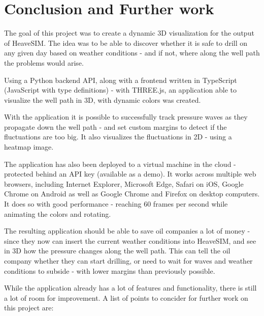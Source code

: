 \hypertarget{conclusion-and-further-work}{%
\section{Conclusion and Further
work}\label{conclusion-and-further-work}}

The goal of this project was to create a dynamic 3D visualization for
the output of HeaveSIM. The idea was to be able to discover whether it
is safe to drill on any given day based on weather conditions - and if
not, where along the well path the problems would arise.

Using a Python backend API, along with a frontend written in TypeScript
(JavaScript with type definitions) - with THREE.js, an application able
to visualize the well path in 3D, with dynamic colors was created.

With the application it is possible to successfully track pressure waves
as they propagate down the well path - and set custom margins to detect
if the fluctuations are too big. It also visualizes the fluctuations in
2D - using a heatmap image.

The application has also been deployed to a virtual machine in the cloud
- protected behind an API key (available as a demo). It works across
multiple web browsers, including Internet Explorer, Microsoft Edge,
Safari on iOS, Google Chrome on Android as well as Google Chrome and
Firefox on desktop computers. It does so with good performance -
reaching 60 frames per second while animating the colors and rotating.

The resulting application should be able to save oil companies a lot of
money - since they now can insert the current weather conditions into
HeaveSIM, and see in 3D how the pressure changes along the well path.
This can tell the oil company whether they can start drilling, or need
to wait for waves and weather conditions to subside - with lower margins
than previously possible.

While the application already has a lot of features and functionality,
there is still a lot of room for improvement. A list of points to
concider for further work on this project are:

